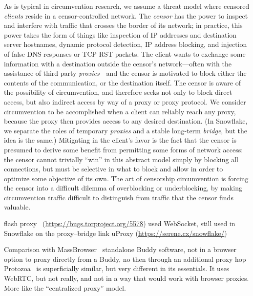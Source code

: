 \documentclass[letterpaper,twocolumn]{article}
\begin{document}
As is typical in circumvention research,
we assume a threat model where
censored \emph{clients} reside in a censor-controlled network.
The \emph{censor} has the power to inspect and interfere with
traffic that crosses the border of its network;
in practice, this power takes the form of things like
inspection of IP addresses and destination server hostnames,
dynamic protocol detection,
IP address blocking, and injection of false DNS responses
or TCP RST packets.
The client wants to exchange some information with a
destination outside the censor's network---often
with the assistance of third-party \emph{proxies}---and
the censor is motivated to block either the contents
of the communication, or the destination itself.
The censor is aware of the possibility of circumvention,
and therefore seeks not only to block direct access,
but also indirect access by way of a proxy or proxy protocol.
We consider circumvention to be accomplished when a client
can reliably reach any proxy,
because the proxy then provides access to any desired destination.
(In Snowflake, we separate the roles of temporary \emph{proxies}
and a stable long-term \emph{bridge}, but the idea is the same.)
Mitigating in the client's favor
is the fact that the censor is presumed to derive some benefit
from permitting some forms of network access:
the censor cannot trivially ``win''
in this abstract model simply by blocking all connections,
but must be selective in what to block and allow
in order to optimize some objective of its own.
The art of censorship circumvention is
forcing the censor into a difficult dilemma
of overblocking or underblocking,
by making circumvention traffic difficult to distinguish
from traffic that the censor finds valuable.

flash proxy~\cite{Fifield2012a} (\url{https://bugs.torproject.org/5578})
used WebSocket, still used in Snowflake on the proxy--bridge link
uProxy (\url{https://serene.cx/snowflake/})

Comparison with MassBrowser~\cite{Nasr2020a}
standalone Buddy software, not in a browser
option to proxy directly from a Buddy, no then through an additional proxy hop
Protozoa~\cite{Barradas2020a} is superficially similar, but very different in its essentials.
It uses WebRTC, but not really, and not in a way that would work with browser proxies.
More like the ``centralized proxy'' model.
\end{document}
